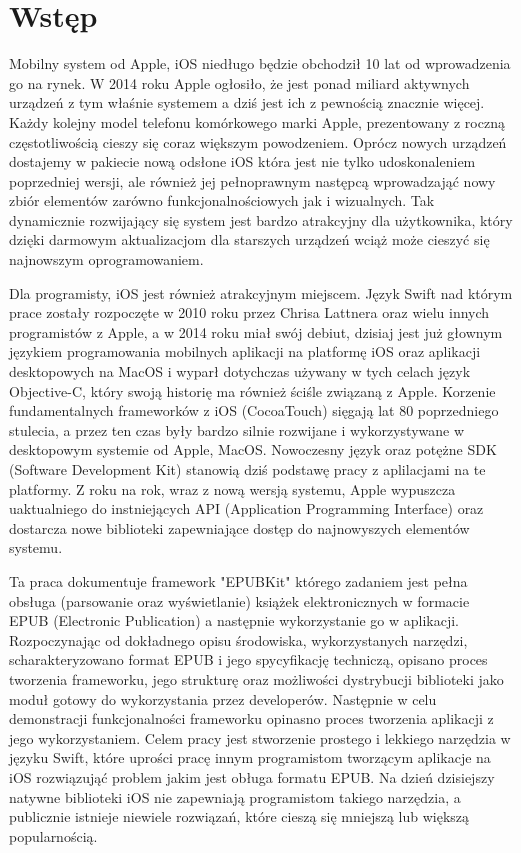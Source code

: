 \chapter{Wstęp}

Mobilny system od Apple, iOS niedługo będzie obchodził 10 lat od wprowadzenia go na rynek. W 2014 roku Apple ogłosiło, że jest
ponad miliard aktywnych urządzeń z tym właśnie systemem a dziś jest ich z pewnością znacznie więcej. Każdy kolejny model telefonu
komórkowego marki Apple, prezentowany z roczną częstotliwością cieszy się coraz większym powodzeniem. Oprócz nowych urządzeń
dostajemy w pakiecie nową odsłone iOS która jest nie tylko udoskonaleniem poprzedniej wersji, ale również jej pełnoprawnym następcą
wprowadzająć nowy zbiór elementów zarówno funkcjonalnościowych jak i wizualnych. Tak dynamicznie rozwijający się system jest bardzo
atrakcyjny dla użytkownika, który dzięki darmowym aktualizacjom dla starszych urządzeń wciąż może cieszyć się najnowszym oprogramowaniem.

Dla programisty, iOS jest również atrakcyjnym miejscem. Język Swift nad którym prace zostały rozpoczęte w 2010 roku przez Chrisa
Lattnera oraz wielu innych programistów z Apple, a w 2014 roku miał swój debiut, dzisiaj jest już głownym językiem programowania
mobilnych aplikacji na platformę iOS oraz aplikacji desktopowych na MacOS i wyparł dotychczas używany w tych celach język Objective-C,
który swoją historię ma również ściśle związaną z Apple. Korzenie fundamentalnych frameworków z iOS (CocoaTouch) sięgają lat 80
poprzedniego stulecia, a przez ten czas były bardzo silnie rozwijane i wykorzystywane w desktopowym systemie od Apple, MacOS.
Nowoczesny język oraz potężne SDK (Software Development Kit) stanowią dziś podstawę pracy z aplilacjami na te platformy. Z roku na rok,
wraz z nową wersją systemu, Apple wypuszcza uaktualniego do instniejących API (Application Programming Interface) oraz dostarcza nowe
biblioteki zapewniające dostęp do najnowyszych elementów systemu.

Ta praca dokumentuje framework "EPUBKit" którego zadaniem jest pełna obsługa (parsowanie oraz wyświetlanie) książek elektronicznych w
formacie EPUB (Electronic Publication) a następnie wykorzystanie go w aplikacji. Rozpoczynając od dokładnego opisu środowiska,
wykorzystanych narzędzi, scharakteryzowano format EPUB i jego spycyfikację techniczą, opisano proces tworzenia frameworku, jego strukturę
oraz możliwości dystrybucji biblioteki jako moduł gotowy do wykorzystania przez developerów. Następnie w celu demonstracji funkcjonalności
frameworku opinasno proces tworzenia aplikacji z jego wykorzystaniem. Celem pracy jest stworzenie prostego i lekkiego narzędzia w języku
Swift, które uprości pracę innym programistom tworzącym aplikacje na iOS rozwiązująć problem jakim jest obługa formatu EPUB. Na dzień
dzisiejszy natywne biblioteki iOS nie zapewniają programistom takiego narzędzia, a publicznie istnieje niewiele rozwiązań, które cieszą
się mniejszą lub większą popularnością.
